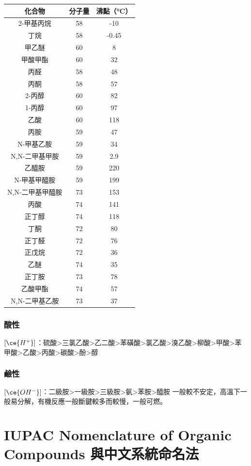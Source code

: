 \documentclass[a4paper,12pt]{report}
\begin{document}
\begin{longtable}[c]{|c|c|c|}
\hline
化合物 & 分子量 & 沸點（°C）\\\hline
2-甲基丙烷 & 58 & -10\\\hline
丁烷 & 58 & -0.45\\\hline
甲乙醚 & 60 & 8\\\hline
甲酸甲酯 & 60 & 32\\\hline
丙醛 & 58 & 48\\\hline
丙酮 & 58 & 57\\\hline
2-丙醇 & 60 & 82\\\hline
1-丙醇 & 60 & 97\\\hline
乙酸 & 60 & 118\\\hline
丙胺 & 59 & 47\\\hline
N-甲基乙胺 & 59 & 34\\\hline
N,N-二甲基甲胺 & 59 & 2.9\\\hline
乙醯胺 & 59 & 220\\\hline
N-甲基甲醯胺 & 59 & 199\\\hline
N,N-二甲基甲醯胺 & 73 & 153\\\hline
丙酸 & 74 & 141\\\hline
正丁醇 & 74 & 118\\\hline
丁酮 & 72 & 80\\\hline
正丁醛 & 72 & 76\\\hline
正戊烷 & 72 & 36\\\hline
乙醚 & 74 & 35\\\hline
正丁胺 & 73 & 78\\\hline
乙酸甲酯 & 74 & 57\\\hline
N,N-二甲基乙胺 & 73 & 37\\\hline
\end{longtable}
\subsubsection{酸性}
$[\ce{H^+}]$：硫酸>三氯乙酸>乙二酸>苯磺酸>氯乙酸>溴乙酸>柳酸>甲酸>苯甲酸>乙酸>丙酸>碳酸>酚>醇
\subsubsection{鹼性}
$[\ce{OH^-}]$：二級胺>一級胺>三級胺>氨>苯胺>醯胺
一般較不安定，高溫下一般易分解，有機反應一般斷鍵較多而較慢，一般可燃。


\section{IUPAC Nomenclature of Organic Compounds 與中文系統命名法}
\end{document}
